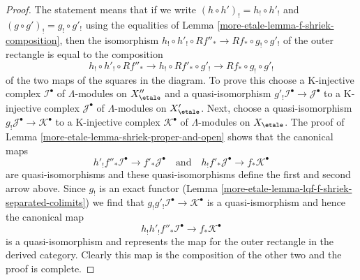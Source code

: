 \begin{proof}
The statement means that if we write
$(h \circ h')_! = h_! \circ h'_!$ and
$(g \circ g')_! = g_! \circ g'_!$
using the equalities of Lemma \ref{more-etale-lemma-f-shriek-composition},
then the isomorphism
$h_! \circ h'_! \circ Rf''_* \to Rf_* \circ g_! \circ g'_!$
of the outer rectangle is equal to the composition
$$
h_! \circ h'_! \circ Rf''_* \to
h_! \circ Rf'_* \circ g'_! \to
Rf_* \circ g_! \circ g'_!
$$
of the two maps of the squares in the diagram. To prove this choose
a K-injective complex $\mathcal{I}^\bullet$ of $\Lambda$-modules
on $X''_\etale$ and a quasi-isomorphism
$g'_!\mathcal{I}^\bullet \to \mathcal{J}^\bullet$
to a K-injective complex $\mathcal{J}^\bullet$ of $\Lambda$-modules
on $X'_\etale$. Next, choose a quasi-isomorphism
$g_!\mathcal{J}^\bullet \to \mathcal{K}^\bullet$
to a K-injective complex $\mathcal{K}^\bullet$ of $\Lambda$-modules
on $X_\etale$.
The proof of Lemma \ref{more-etale-lemma-shriek-proper-and-open} shows that the canonical
maps
$$
h'_!f''_*\mathcal{I}^\bullet \to f'_*\mathcal{J}^\bullet
\quad\text{and}\quad
h_!f'_*\mathcal{J}^\bullet \to f_*\mathcal{K}^\bullet
$$
are quasi-isomorphisms and these quasi-isomorphisms define the
first and second arrow above. Since $g_!$ is an exact functor
(Lemma \ref{more-etale-lemma-lqf-f-shriek-separated-colimits})
we find that $g_!g'_!\mathcal{I}^\bullet \to \mathcal{K}^\bullet$
is a quasi-ismorphism and hence the canonical map
$$
h_!h'_!f''_*\mathcal{I}^\bullet \to f_*\mathcal{K}^\bullet
$$
is a quasi-isomorphism and represents the map for the outer
rectangle in the derived category. Clearly this map is the
composition of the other two and the proof is complete.
\end{proof}

